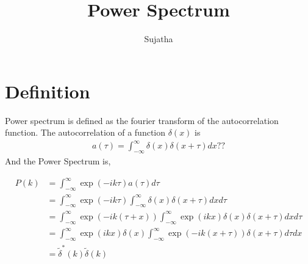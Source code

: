 \documentclass{article}
\title{Power Spectrum}
\author{Sujatha}
\begin{document}
\maketitle
\section{Definition}
Power spectrum is defined as the fourier transform of the autocorrelation function. The autocorrelation of a function 
$\delta(x)$ is 
\begin{align*}
a(\tau) = \int_{-\infty}^{\infty}\delta(x) \delta(x+\tau)dx  ??
\end{align*}
And the Power Spectrum is,

\begin{align*}
 P(k)& = \int_{-\infty}^{\infty}\exp(-ik\tau)a(\tau)d\tau\\
 &= \int_{-\infty}^{\infty}\exp(-ik\tau)\int_{-\infty}^{\infty}\delta(x) \delta(x+\tau)dxd\tau\\
  &= \int_{-\infty}^{\infty}\exp(-ik(\tau+x))\int_{-\infty}^{\infty}\exp(ikx)\delta(x) \delta(x+\tau)dxd\tau\\
    &= \int_{-\infty}^{\infty}\exp(ikx)\delta(x)\int_{-\infty}^{\infty}\exp(-ik(x+\tau)) \delta(x+\tau)d\tau dx\\
    &= \tilde{\delta}^{*}(k)\tilde{\delta}(k)
\end{align*}
\end{document}
